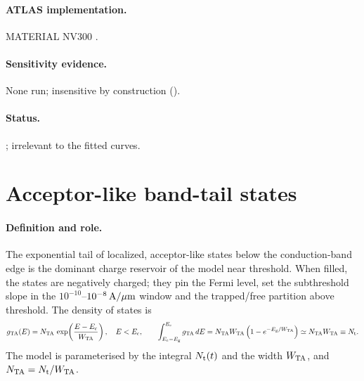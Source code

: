 \paragraph{ATLAS implementation.}
MATERIAL NV300 \citep[p.~1340]{AtlasManual}.

\paragraph{Sensitivity evidence.}
None run; insensitive by construction (\evTHEORY).

\paragraph{Status.}
; irrelevant to the fitted curves.

\section{Acceptor-like band-tail states}
\label{sec:par-tail}

\paragraph{Definition and role.}
The exponential tail of localized, acceptor-like states below the conduction-band edge is the dominant
charge reservoir of the model near threshold. When filled, the states are negatively charged; they pin the
Fermi level, set the subthreshold slope in the $10^{-10}$--$10^{-8}\,\mathrm{A}/\mu\mathrm{m}$ window and the trapped/free partition
above threshold. The density of states is
\begin{equation}
  g_{\mathrm{TA}}(E) = N_{\mathrm{TA}}\,\exp\!\left(\frac{E-E_{\mathrm{c}}}{W_{\mathrm{TA}}}\right),\quad E<E_{\mathrm{c}},
  \qquad
  \int_{E_{\mathrm{c}}-E_{\mathrm{g}}}^{E_{\mathrm{c}}} g_{\mathrm{TA}}\,dE = N_{\mathrm{TA}}W_{\mathrm{TA}}\left(1-e^{-E_{\mathrm{g}}/W_{\mathrm{TA}}}\right) \simeq N_{\mathrm{TA}}W_{\mathrm{TA}} \equiv N_{\mathrm{t}} .
  \label{eq:tail-dos}
\end{equation}
The model is parameterised by the integral $N_{\mathrm{t}}(t)$ and the width $W_{\mathrm{TA}}$, and $N_{\mathrm{TA}} = N_{\mathrm{t}}/W_{\mathrm{TA}}$.

